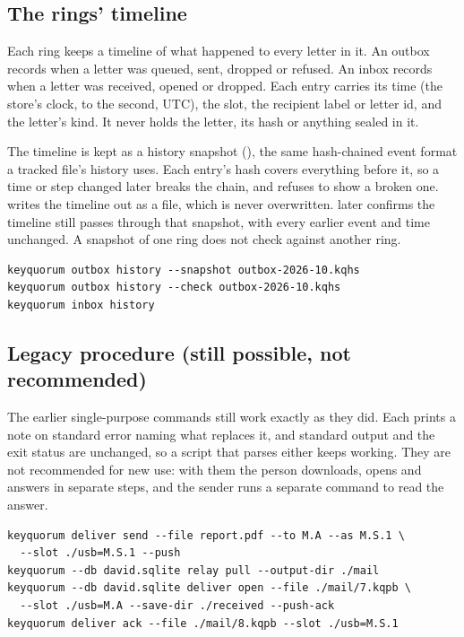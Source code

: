 \subsection{The rings' timeline}
\label{sec:ring-timeline}

Each ring keeps a timeline of what happened to every letter in it. An outbox
records when a letter was queued, sent, dropped or refused. An inbox records
when a letter was received, opened or dropped. Each entry carries its time (the
store's clock, to the second, UTC), the slot, the recipient label or letter
id, and the letter's kind. It never holds the letter, its hash or anything
sealed in it.

The timeline is kept as a history snapshot (), the same
hash-chained event format a tracked file's history uses. Each entry's hash
covers everything before it, so a time or step changed later breaks the chain,
and  refuses to show a broken one.  writes
the timeline out as a  file, which is never overwritten.
 later confirms the timeline still passes through that
snapshot, with every earlier event and time unchanged. A snapshot of one ring
does not check against another ring.

\begin{lstlisting}
keyquorum outbox history --snapshot outbox-2026-10.kqhs
keyquorum outbox history --check outbox-2026-10.kqhs
keyquorum inbox history
\end{lstlisting}

\subsection{Legacy procedure (still possible, not recommended)}

The earlier single-purpose commands still work exactly as they did. Each prints
a note on standard error naming what replaces it, and standard output and the
exit status are unchanged, so a script that parses either keeps working. They
are not recommended for new use: with them the person downloads, opens and
answers in separate steps, and the sender runs a separate command to read the
answer.

\begin{lstlisting}
keyquorum deliver send --file report.pdf --to M.A --as M.S.1 \
  --slot ./usb=M.S.1 --push
keyquorum --db david.sqlite relay pull --output-dir ./mail
keyquorum --db david.sqlite deliver open --file ./mail/7.kqpb \
  --slot ./usb=M.A --save-dir ./received --push-ack
keyquorum deliver ack --file ./mail/8.kqpb --slot ./usb=M.S.1
\end{lstlisting}

